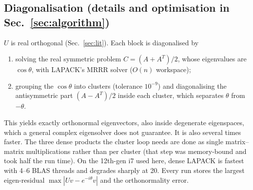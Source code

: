 \subsection{Diagonalisation (details and optimisation in Sec.~\ref{sec:algorithm})}
$U$ is real orthogonal (Sec.~\ref{sec:lit}). Each block is diagonalised by
\begin{enumerate}
\item solving the real symmetric problem $C=(A+A^T)/2$, whose eigenvalues are
  $\cos\theta$, with LAPACK's MRRR solver ($O(n)$ workspace);
\item grouping the $\cos\theta$ into clusters (tolerance $10^{-9}$) and
  diagonalising the antisymmetric part $(A-A^T)/2$ inside each cluster, which
  separates $\theta$ from $-\theta$.
\end{enumerate}
This yields exactly orthonormal eigenvectors, also inside degenerate eigenspaces,
which a general complex eigensolver does not guarantee. It is also several times
faster. The three dense products the cluster loop needs are done as single
matrix--matrix multiplications rather than per cluster (that step was memory-bound
and took half the run time). On the 12th-gen i7 used here, dense LAPACK is
fastest with 4--6 BLAS threads and degrades sharply at 20. Every run stores the
largest eigen-residual $\max|U v-e^{-i\theta}v|$ and the orthonormality error.

